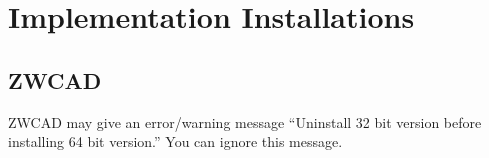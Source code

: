 \chapter{Implementation Installations}
\section{ZWCAD}
ZWCAD may give an error/warning message ``Uninstall 32 bit version before installing 64 bit version.''  You can ignore this message.
